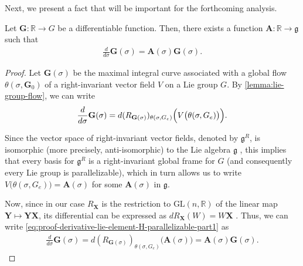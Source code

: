 Next, we present a fact that will be important for the forthcoming analysis. 
\begin{lemma} \label{lemma:derivative-lie-element-H-parallelizable} Let $\mathbf{G}:\mathbb{R}\to G$ be a differentiable function. Then, there exists a function $\mathbf{A}:\mathbb{R} \to \mathfrak{g}$ such that 
\begin{align}
    \frac{d}{d\sigma} \mathbf{G}(\sigma) = \mathbf{A}(\sigma) \mathbf{G}(\sigma). \label{eq:derivative-lie-element-H-parallelizable}
\end{align}

\end{lemma}
\begin{proof}
    Let $\mathbf{G}(\sigma)$ be the maximal integral curve associated with a global flow $\theta(\sigma, \mathbf{G}_0)$ of a right-invariant vector field $V$ on a Lie group $G$. By \cref{lemma:lie-group-flow}, we can write
    \begin{align}
        \frac{d}{d\sigma} \mathbf{G}(\sigma) = d(R_{\mathbf{G}(\sigma)})_{\theta(\sigma, G_e)} \Bigl(V\bigl(\theta(\sigma, G_e)\bigr)\Bigr). \label{eq:proof-derivative-lie-element-H-parallelizable-part1}
    \end{align}
    
    Since the vector space of right-invariant vector fields, denoted by $\mathfrak{g}^R$, is isomorphic (more precisely, anti-isomorphic) to the Lie algebra $\mathfrak{g}$ \citep[p. 569]{Gallier2020}, this implies that every basis for $\mathfrak{g}^R$ is a right-invariant global frame for $G$ (and consequently every Lie group is parallelizable), which in turn allows us to write $V\bigl(\theta(\sigma, G_e)\bigr) = \mathbf{A}(\sigma)$ for some $\mathbf{A}(\sigma)$ in $\mathfrak{g}$.

    Now, since in our case $R_\mathbf{X}$ is the restriction to $\text{GL}(n, \mathbb{R})$ of the linear map $\mathbf{Y}\mapsto \mathbf{Y}\mathbf{X}$, its differential can be expressed as $dR_\mathbf{X}(W) = W\mathbf{X}$ \citep[p. 194]{Lee2012}. Thus, we can write \eqref{eq:proof-derivative-lie-element-H-parallelizable-part1} as
    \begin{align}
        \frac{d}{d\sigma} \mathbf{G}(\sigma) = d(R_{\mathbf{G}(\sigma)})_{\theta(\sigma, G_e)} \bigl(\mathbf{A}(\sigma)\bigr) = \mathbf{A}(\sigma)\mathbf{G}(\sigma).
    \end{align}
\end{proof}

